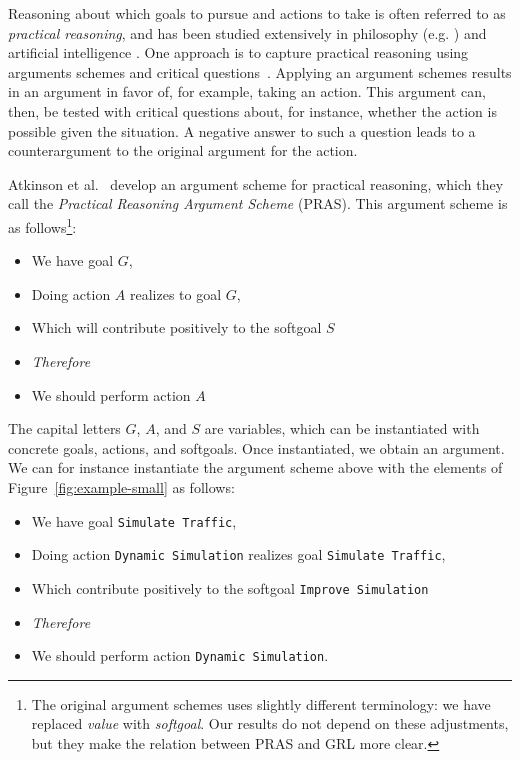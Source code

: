 Reasoning about which goals to pursue and actions to take is often referred to as \emph{practical reasoning}, and has been studied extensively in philosophy (e.g. \cite{Raz1978-RAZPR,walton1990}) and artificial intelligence \cite{bratman1987,atkinson2007}. One approach is to capture practical reasoning using arguments schemes and critical questions~\cite{walton1990}. Applying an argument schemes results in an argument in favor of, for example, taking an action. This argument can, then, be tested with critical questions about, for instance, whether the action is possible given the situation. A negative answer to such a question leads to a counterargument to the original argument for the action. 

Atkinson et al.~\cite{atkinson2007} develop an argument scheme for practical reasoning, which they call the \emph{Practical Reasoning Argument Scheme} (PRAS). This argument scheme is as follows\footnote{The original argument schemes uses slightly different terminology: we have replaced \emph{value} with \emph{softgoal}. Our results do not depend on these adjustments, but they make the relation between PRAS and GRL more clear.}:

\begin{itemize}
\item[] We have goal $G$,
\item[] Doing action $A$ realizes to goal $G$,
\item[] Which will contribute positively to the softgoal $S$
\item[] \textit{Therefore} 
\item[] We should perform action $A$
\end{itemize}

The capital letters $G$, $A$, and $S$ are variables, which can be instantiated with concrete goals, actions, and softgoals. Once instantiated, we obtain an argument. We can for instance instantiate the argument scheme above with the elements of Figure~\ref{fig:example-small} as follows: 
\begin{itemize}
\item[] We have goal \texttt{Simulate Traffic},
\item[] Doing action \texttt{Dynamic Simulation} realizes goal \texttt{Simulate Traffic}, 
\item[] Which contribute positively to the softgoal \texttt{Improve Simulation} 
\item[] \textit{Therefore} 
\item[] We should perform action \texttt{Dynamic Simulation}.
\end{itemize}

